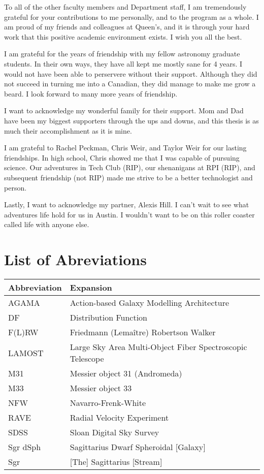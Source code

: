 To all of the other faculty members and Department staff, I am tremendously grateful for your contributions to me personally, and to the program as a whole. I am proud of my friends and colleagues at Queen's, and it is through your hard work that this positive academic environment exists. I wish you all the best.

I am grateful for the years of friendship with my fellow astronomy graduate students. In their own ways, they have all kept me mostly sane for 4 years. I would not have been able to perservere without their support. Although they did not succeed in turning me into a Canadian, they did manage to make me grow a beard. I look forward to many more years of friendship.

I want to acknowledge my wonderful family for their support. Mom and Dad have been my biggest supporters through the ups and downs, and this thesis is as much their accomplishment as it is mine. 

I am grateful to Rachel Peckman, Chris Weir, and Taylor Weir for our lasting friendships. In high school, Chris showed me that I was capable of pursuing science. Our adventures in Tech Club (RIP), our shenanigans at RPI (RIP), and subsequent friendship (not RIP) made me strive to be a better technologist and person.

Lastly, I want to acknowledge my partner, Alexis Hill. I can't wait to see what adventures life hold for us in Austin. I wouldn't want to be on this roller coaster called life with anyone else.



\singlespacing \afterpreface \doublespacing

\chapter*{List of Abreviations}
\begin{longtable}{ll} 
\hline
Abbreviation & Expansion \\ \hline
\textsc{AGAMA} & Action-based Galaxy Modelling Architecture \\
DF & Distribution Function \\
F(L)RW & Friedmann (Lema\^itre) Robertson Walker\\
LAMOST & Large Sky Area Multi-Object Fiber Spectroscopic Telescope \\
M31 & Messier object 31 (Andromeda) \\
M33 & Messier object 33\\
NFW & Navarro-Frenk-White\\
RAVE & Radial Velocity Experiment \\
SDSS & Sloan Digital Sky Survey\\
Sgr dSph & Sagittarius Dwarf Spheroidal [Galaxy]\\
Sgr  & [The] Sagittarius [Stream]\\ \hline
\end{longtable}

